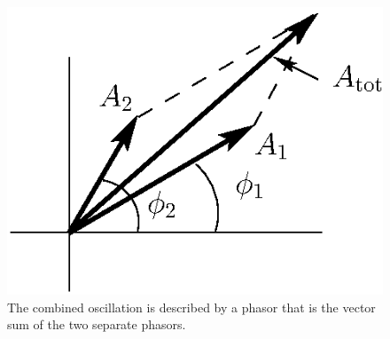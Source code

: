 \begin{figure}
\begin{center}
 \includegraphics[width=2.0truein]{phasors/phasor09} 
\caption{\label{fig:phasor09}The combined oscillation is described by 
a phasor that is the vector sum of the two separate phasors.}
\end{center}
\end{figure}

